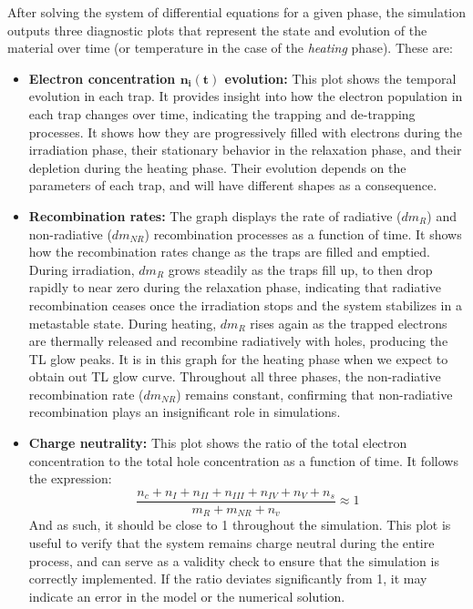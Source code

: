 \vspace{10pt}

After solving the system of differential equations for a given phase, the simulation outputs three diagnostic plots that represent the state and evolution of the material over time (or temperature in the case of the \textit{heating} phase). These are:

\begin{itemize}
    \item \textbf{Electron concentration $\mathbf{n_i(t)}$ evolution:} This plot shows the temporal evolution in each trap. It provides insight into how the electron population in each trap changes over time, indicating the trapping and de-trapping processes. It shows how they are progressively filled with electrons during the irradiation phase, their stationary behavior in the relaxation phase, and their depletion during the heating phase. Their evolution depends on the parameters of each trap, and will have different shapes as a consequence.
    \item \textbf{Recombination rates:} The graph displays the rate of radiative ($dm_R$) and non-radiative ($dm_{NR}$) recombination processes as a function of time. It shows how the recombination rates change as the traps are filled and emptied. During irradiation, $dm_R$ grows steadily as the traps fill up, to then drop rapidly to near zero during the relaxation phase, indicating that radiative recombination ceases once the irradiation stops and the system stabilizes in a metastable state. During heating, $dm_R$ rises again as the trapped electrons are thermally released and recombine radiatively with holes, producing the TL glow peaks. It is in this graph for the heating phase when we expect to obtain out TL glow curve. Throughout all three phases, the non-radiative recombination rate ($dm_{NR}$) remains constant, confirming that non-radiative recombination plays an insignificant role in simulations.
    \item \textbf{Charge neutrality:} This plot shows the ratio of the total electron concentration to the total hole concentration as a function of time. It follows the expression:
    \begin{equation}
        \frac{n_c + n_I + n_{II} + n_{III} + n_{IV} + n_V + n_s}{m_R + m_{N\!R} + n_v} \approx 1
        \label{eq:charge_neutrality}
    \end{equation}
    And as such, it should be close to 1 throughout the simulation. This plot is useful to verify that the system remains charge neutral during the entire process, and can serve as a validity check to ensure that the simulation is correctly implemented. If the ratio deviates significantly from 1, it may indicate an error in the model or the numerical solution.
\end{itemize}